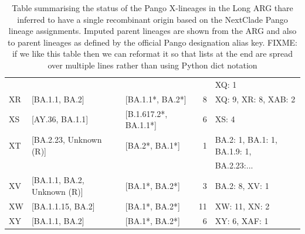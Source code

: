 \documentclass{article}
\begin{document}
\begin{table}
\begin{tabular}{lllrl}
    &&&& XQ: 1 \\
XR      &               [BA.1.1, BA.2] &       [BA.1.1*, BA.2*] &   8 &
    XQ: 9, XR: 8, XAB: 2\\
XS      &              [AY.36, BA.1.1] &  [B.1.617.2*, BA.1.1*] &   6 & XS: 4\\
XT      &       [BA.2.23, Unknown (R)] &         [BA.2*, BA.1*] &   1 &
    BA.2: 1, BA.1: 1, BA.1.9: 1, \\
    &&&& BA.2.23:... \\
XV      &  [BA.1.1, BA.2, Unknown (R)] &         [BA.1*, BA.2*] &   3 & BA.2: 8, XV: 1 \\
XW      &            [BA.1.1.15, BA.2] &         [BA.1*, BA.2*] &  11 & XW: 11, XN: 2 \\
XY      &               [BA.1.1, BA.2] &         [BA.1*, BA.2*] &   6 & XY: 6, XAF: 1 \\
\bottomrule
\end{tabular}
\caption{\label{tab:pango-single-origin}
Table summarising the status of the Pango X-lineages in the Long ARG thare inferred to have a single recombinant origin based on the NextClade Pango lineage assignments. Imputed parent lineages are shown from the ARG and also to parent lineages as defined by the official Pango designation alias key. FIXME: if we like this table then we can reformat it so that lists at the end are spread over multiple lines rather than using Python dict notation }
\end{table}
\end{document}
